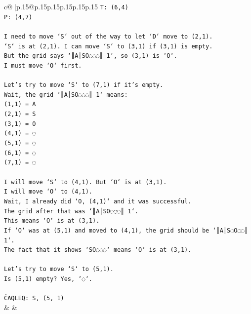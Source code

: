 \documentclass{article}
\begin{document}
{\begin{supertabular}{c@{$\;$}|p{.15\linewidth}@{}p{.15\linewidth}p{.15\linewidth}p{.15\linewidth}p{.15\linewidth}p{.15\linewidth}}
{{{\texttt{T: (6,4)} \\
\texttt{P: (4,7)} \\
\\ 
\texttt{I need to move `S` out of the way to let `D` move to (2,1).} \\
\texttt{`S` is at (2,1). I can move `S` to (3,1) if (3,1) is empty.} \\
\texttt{But the grid says `║A│SO◌◌◌║ 1`, so (3,1) is `O`.} \\
\texttt{I must move `O` first.} \\
\\ 
\texttt{Let's try to move `S` to (7,1) if it's empty.} \\
\texttt{Wait, the grid `║A│SO◌◌◌║ 1` means:} \\
\texttt{(1,1) = A} \\
\texttt{(2,1) = S} \\
\texttt{(3,1) = O} \\
\texttt{(4,1) = ◌} \\
\texttt{(5,1) = ◌} \\
\texttt{(6,1) = ◌} \\
\texttt{(7,1) = ◌} \\
\\ 
\texttt{I will move `S` to (4,1). But `O` is at (3,1).} \\
\texttt{I will move `O` to (4,1).} \\
\texttt{Wait, I already did `O, (4,1)` and it was successful.} \\
\texttt{The grid after that was `║A│SO◌◌◌║ 1`.} \\
\texttt{This means `O` is at (3,1).} \\
\texttt{If `O` was at (5,1) and moved to (4,1), the grid should be `║A│S◌O◌◌║ 1`.} \\
\texttt{The fact that it shows `SO◌◌◌` means `O` is at (3,1).} \\
\\ 
\texttt{Let's try to move `S` to (5,1).} \\
\texttt{Is (5,1) empty? Yes, `◌`.} \\
\\ 
\texttt{ĊAQLEQ: S, (5, 1)} \\
            }
        }
    }
    & & \\ \\


\end{supertabular}}
\end{document}
